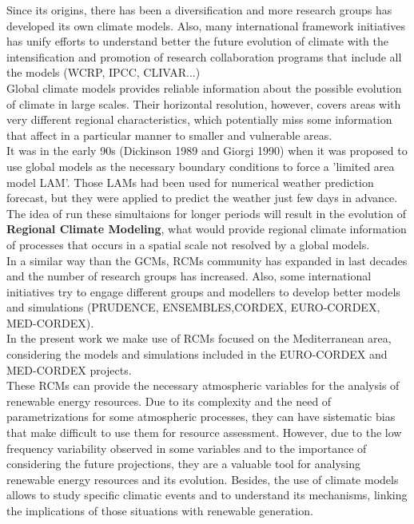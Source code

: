 Since its origins, there has been a diversification and more research groups has developed its own climate models. Also, many international framework initiatives has unify efforts to understand better the future evolution of climate with the intensification and promotion of research collaboration programs that include all the models (WCRP, IPCC, CLIVAR...)\\   

Global climate models provides reliable information about the possible evolution of climate in large scales. Their horizontal resolution, however, covers areas with very different regional characteristics, which potentially miss some information that affect in a particular manner to smaller and vulnerable areas.\\

It was in the early 90s (Dickinson 1989 and Giorgi 1990) when it was proposed to use global models as the necessary boundary conditions to force a 'limited area model LAM'. Those LAMs had been used for numerical weather prediction forecast, but they were applied to predict the weather just few days in advance. The idea of run these simultaions for longer periods will result in the evolution of \textbf{Regional Climate Modeling}, what would provide regional climate information of processes that occurs in a spatial scale not resolved by a global models.\\

In a similar way than the GCMs, RCMs community has expanded in last decades and the number of research groups has increased. Also, some international initiatives try to engage different groups and modellers to develop better models and simulations (PRUDENCE, ENSEMBLES,CORDEX, EURO-CORDEX, MED-CORDEX).\\

In the present work we make use of RCMs focused on the Mediterranean area, considering the models and simulations included in the EURO-CORDEX and MED-CORDEX projects.\\

These RCMs can provide the necessary atmospheric variables for the analysis of renewable energy resources. Due to its complexity and the need of parametrizations for some atmospheric processes, they can have sistematic bias that make difficult to use them for resource assessment. However, due to the low frequency variability observed in some variables and to the importance of considering the future projections, they are a valuable tool for analysing renewable energy resources and its evolution. Besides, the use of climate models allows to study specific climatic events and to understand its mechanisms, linking the implications of those situations with renewable generation.\\

